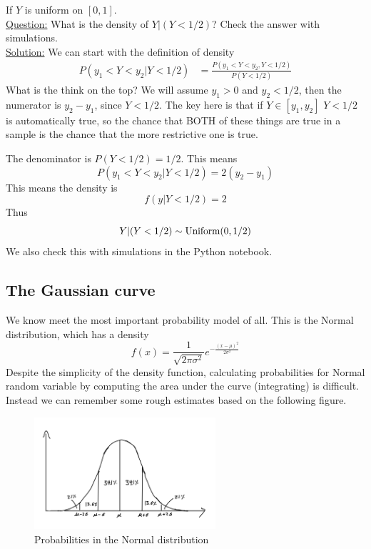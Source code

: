 \begin{example}
If $Y$ is uniform on $[0,1]$. \\


\noindent
\underline{Question:}  What is the density of $Y|(Y<1/2)$? Check the answer with simulations.\\

 \noindent
\underline{Solution:} We can start with the definition of density
\begin{align*}
P(y_1<Y<y_2|Y<1/2) &= \frac{P(y_1<Y<y_2,Y<1/2)}{P(Y<1/2)}
\end{align*}
What is the think on the top? We will assume $y_1>0$ and $y_2<1/2$, then the numerator is $y_2-y_1$, since $Y<1/2$. The key here is that if $Y \in [y_1,y_2]$ $Y<1/2$ is automatically true, so the chance that BOTH of these things are true in a sample is the chance that the more restrictive one is true.

The denominator is $P(Y<1/2) = 1/2$. This means
\begin{equation*}
P(y_1<Y<y_2|Y<1/2) = 2(y_2-y_1)
\end{equation*}
This means the density is
\begin{equation*}
f(y|Y<1/2) = 2
\end{equation*}
Thus
\begin{equation*}
Y|(Y<1/2) \sim {\rm Uniform}(0,1/2)
\end{equation*}
We also check this with simulations in the Python notebook. 
\end{example}


  \subsection{The Gaussian curve}
We know meet the most important probability model of all. This is the Normal distribution, which has a density 
   \begin{equation*}
   f(x) = \frac{1}{\sqrt{2\pi \sigma^2}}e^{-\frac{(x-\mu)^2}{2 \sigma^2}}
   \end{equation*}
 Despite the simplicity of the density function, calculating probabilities for Normal random variable by computing the area under the curve (integrating) is difficult. Instead we can remember some rough estimates based on the following figure. 

\begin{figure}[h]
\centering
\includegraphics[width=0.6\textwidth]{./../figures/bellcurve}
\caption{Probabilities in the Normal distribution}\label{fig:bellcurve}
\end{figure}



